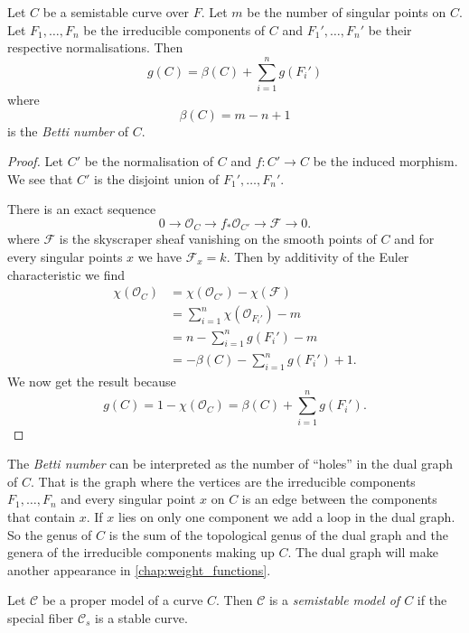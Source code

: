 \begin{lemma}\label{lem:genus_semi_stable_curve}
	Let $C$ be a semistable curve over $F$. 
	Let $m$ be the number of singular points on $C$. 
	Let $F_1, \ldots, F_n$ be the irreducible components of $C$ and $F_1', \ldots, F_n'$ be their respective normalisations.
	Then \[
		g(C) = \beta(C) + \sum_{i = 1}^{n} g(F_i')
	\] 
	where \[
		\beta(C) = m - n + 1
	\]
	is the \emph{Betti number} of $C$. 
\end{lemma}
\begin{proof}
	Let $C'$ be the normalisation of $C$ and $f: C' \to C$ be the induced morphism. 
	We see that  $C'$ is the disjoint union of $F_1', \ldots, F_n'$. 

	There is  an exact sequence \[
	0 \to \mathcal{O}_C \to f_* \mathcal{O}_{C'} \to \mathcal{F} \to 0 
	.\] 
	where $\mathcal{F} $ is the skyscraper sheaf vanishing on the smooth points of $C$ and for every singular points $x$ we have $\mathcal{F} _x = k$.  
	Then by additivity of the Euler characteristic we find
	\begin{align*}
		\chi(\mathcal O_C) &= \chi(\mathcal O_{C'}) - \chi(\mathcal F) \\
				   &= \sum_{i = 1}^{n} \chi(\mathcal O_{F_i'}) - m\\
				   &= n -  \sum_{i = 1}^{n} g(F_i') - m\\
				   &= -\beta(C) - \sum_{i = 1}^{n} g(F_i') + 1 
	.\end{align*}
	We now get the result because \[
		g(C) = 1 - \chi(\mathcal{O}_C) = \beta(C) + \sum_{i = 1}^{n} g(F_i')  
	.\] 
\end{proof}
\begin{remark}
	The \emph{Betti number} can be interpreted as the number of ``holes'' in the dual graph of $C$. 
	That is the graph where the vertices are the irreducible components $F_1, \ldots, F_n$ and every singular point $x$ on $C$ is an edge between the components that contain $x$.
	If $x$ lies on only one component we add a loop in the dual graph.
	So the genus of $C$ is the sum of the topological genus of the dual graph and the genera of the irreducible components making up $C$.
	The dual graph will make another appearance in \cref{chap:weight_functions}. 
\end{remark}

\begin{definition}\label{def:semi_stable_model}
	Let  $\mathscr C$ be a proper model of a curve $C$. 
	Then $\mathscr C$ is a \emph{semistable model of $C$} if the special fiber $\mathscr C_s$ is a stable curve. 
\end{definition}

